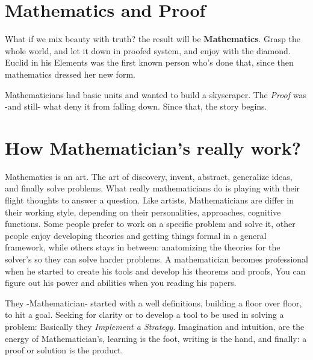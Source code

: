 \section{Mathematics and Proof}
What if we mix beauty with truth? the result will be {\bf Mathematics}. Grasp the whole world, and let it down in proofed system, and enjoy with the diamond. Euclid in his Elements\cite{euclid1956elements} was the first known person who's done that, since then mathematics dressed her new form.

Mathematicians had basic units and wanted to build a skyscraper. The {\it Proof} was -and still- what deny it from falling down. Since that, the story begins.

\section{How Mathematician's really work?}\label{intro.work}
Mathematics is an art. The art of discovery, invent, abstract, generalize ideas, and finally solve problems. What really mathematicians do is playing with their flight thoughts to answer a question. Like artists, Mathematicians are  differ in their working style, depending on their personalities, approaches, cognitive functions. Some people prefer to work on a specific problem and solve it, other people enjoy developing theories and getting things formal in a general framework, while others stays in between: anatomizing the theories for the solver's so they can solve harder problems. A mathematician becomes professional when he started to create his tools and develop his theorems and proofs, You can figure out his power and abilities when you reading his papers.

They -Mathematician- started with a well definitions, building a floor over floor, to hit a goal. Seeking for clarity or to develop a tool to be used in solving a problem: Basically they {\it Implement a Strategy}. Imagination and intuition, are the energy of Mathematician's, learning is the foot, writing is the hand, and finally: a proof or solution is the product.
